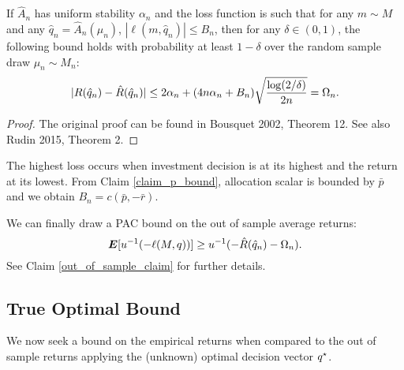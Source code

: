 \documentclass[11pt]{article}
\begin{document}
\begin{thm}
  \label{thm2}
  If $\hat A_n$ has uniform stability $\alpha_n$ and the loss function is such that for
  any $m\sim M$ and any $\hat q_n=\hat A_n(\mu_n)$, $|\ell(m,\hat q_n)|\leq B_n$, then for
  any $\delta\in(0,1)$, the following bound holds with probability at least $1-\delta$
  over the random sample draw $\mu_n\sim M_n$:
  \begin{equation*}
    |R({\hat q}_n) - \hat R({\hat q}_n)| \leq 2\alpha_n + (4n\alpha_n +
    B_n)\sqrt{\frac{\log(2/\delta)}{2n}} = \Omega_n.
  \end{equation*}
\end{thm}

\begin{proof}
  The original proof can be found in Bousquet 2002, Theorem 12. See also Rudin 2015,
  Theorem 2. 
\end{proof}

\begin{rem}
  The highest loss occurs when investment decision is at its highest and the return at its
  lowest. From Claim \ref{claim_p_bound}, allocation scalar is bounded by $\bar p$ and we
  obtain $B_n = c(\bar p, -\bar r)$.
\end{rem}

We can finally draw a PAC bound on the out of sample average returns:
\begin{equation}
  \bm E[u^{-1}(-\ell(M,q))] \geq u^{-1}(-\hat R(\hat q_n) - \Omega_n).
\end{equation}
See Claim \ref{out_of_sample_claim} for further details.
 
\subsection{True Optimal Bound}


We now seek a bound on the empirical returns when compared to the out of sample returns
applying the (unknown) optimal decision vector ${q^\star}$. 
\end{document}
